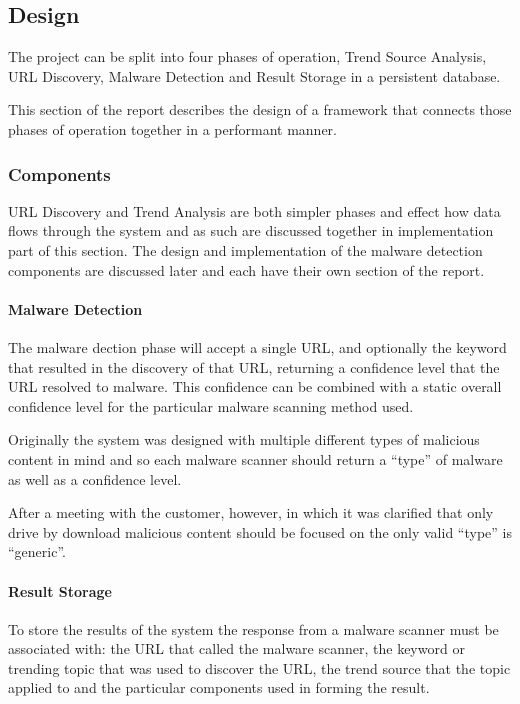 \subsection{Design}
The project can be split into four phases of operation, Trend Source Analysis, URL Discovery, Malware Detection and Result Storage in a persistent database.

This section of the report describes the design of a framework that connects those phases of operation together in a performant manner.

\subsubsection{Components}
URL Discovery and Trend Analysis are both simpler phases and effect how data flows through the system and as such are discussed together in implementation part of this section. The design and implementation of the malware detection components are discussed later and each have their own section of the report.





\paragraph{Malware Detection}
The malware dection phase will accept a single URL, and optionally the keyword that resulted in the discovery of that URL, returning a confidence level that the URL resolved to malware.  This confidence can be combined with a static overall confidence level for the particular malware scanning method used.

Originally the system was designed with multiple different types of malicious content in mind and so each malware scanner should return a ``type'' of malware as well as a confidence level. 

After a meeting with the customer, however, in which it was clarified that only drive by download malicious content should be focused on the only valid ``type'' is ``generic''.

\paragraph{Result Storage}
To store the results of the system the response from a malware scanner must be associated with: the URL that called the malware scanner, the keyword or trending topic that was used to discover the URL, the trend source that the topic applied to and the particular components used in forming the result.

